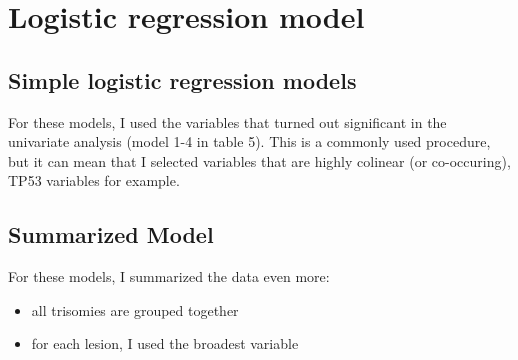 \documentclass[a4paper,11pt]{article}
\begin{document}
% 
% 
% 
% 
% 
% 

\section*{Logistic regression model}
\subsection*{Simple logistic regression models}
For these models, I used the variables that turned out significant in the univariate analysis (model 1-4 in table 5). This is a commonly used procedure, but it can mean that I selected variables that are highly colinear (or co-occuring), TP53 variables for example.
\subsection*{Summarized Model}
For these models, I summarized the data even more:
\begin{itemize}
  \item all trisomies are grouped together
  \item for each lesion, I used the broadest variable
\end{itemize}
\end{document}
